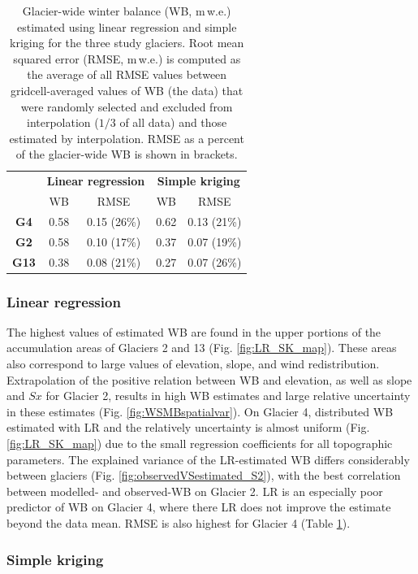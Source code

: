 \documentclass[twocolumn, letterpaper]{igs}
\begin{document}
\begin{table}[]
\centering
\caption{Glacier-wide winter balance (WB, m\,w.e.) estimated using linear regression and simple kriging for the three study glaciers. Root mean squared error (RMSE, m\,w.e.) is computed as the average of all RMSE values between gridcell-averaged values of WB (the data) that were randomly selected and excluded from interpolation ($1/3$ of all data) and those estimated by interpolation. RMSE as a percent of the glacier-wide WB is shown in brackets.}
\label{tab:WSMB&RMSE}
\begin{tabular}{c|cc|cc}
 & \multicolumn{2}{c|}{\textbf{Linear regression}} & \multicolumn{2}{c}{\textbf{Simple kriging}} \\
 & WB & RMSE & WB & RMSE \\ \hline
\textbf{G4} & 0.58 & 0.15 (26\%) & 0.62 & 0.13 (21\%) \\
\textbf{G2} & 0.58 & 0.10 (17\%) & 0.37 & 0.07 (19\%) \\
\textbf{G13} & 0.38 & 0.08 (21\%) & 0.27 & 0.07 (26\%)
\end{tabular}
\end{table}

\subsubsection{Linear regression}

The highest values of estimated WB are found in the upper portions of the accumulation areas of Glaciers 2 and 13 (Fig. \ref{fig:LR_SK_map}). These areas also correspond to large values of elevation, slope, and wind redistribution. Extrapolation of the positive relation between WB and elevation, as well as slope and $Sx$ for Glacier 2, results in high WB estimates and large relative uncertainty in these estimates (Fig. \ref{fig:WSMBspatialvar}). On Glacier 4, distributed WB estimated with LR and the relatively uncertainty is almost uniform (Fig. \ref{fig:LR_SK_map}) due to the small regression coefficients for all topographic parameters. The explained variance of the LR-estimated WB differs considerably between glaciers (Fig. \ref{fig:observedVSestimated_S2}), with the best correlation between modelled- and observed-WB on Glacier 2. LR is an especially poor predictor of WB on Glacier 4, where there LR does not improve the estimate beyond the data mean. RMSE is also highest for Glacier 4 (Table \ref{tab:WSMB&RMSE}). 

\subsubsection{Simple kriging}
\end{document}
